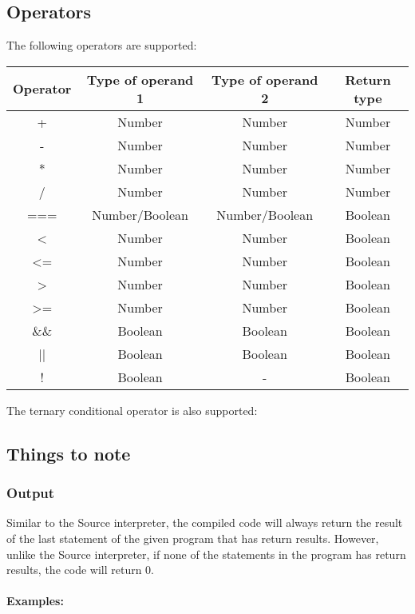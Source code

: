 \subsection{Operators}
The following operators are supported: 
\begin{center}
  \begin{tabular}{|c | c | c | c|} 
   \hline
   Operator & Type of operand 1 & Type of operand 2 & Return type \\ 
   \hline\hline
   + & Number & Number & Number \\ 
   \hline
   - & Number & Number & Number \\ 
   \hline
   * & Number & Number & Number \\ 
   \hline
   / & Number & Number & Number \\ 
   \hline
   === & Number/Boolean & Number/Boolean & Boolean \\ 
   \hline
   < & Number & Number & Boolean \\ 
   \hline
   <= & Number & Number & Boolean \\ 
   \hline
   > & Number & Number & Boolean \\ 
   \hline
   >= & Number & Number & Boolean \\ 
   \hline
   \&\& & Boolean & Boolean & Boolean \\ 
   \hline
   || & Boolean & Boolean & Boolean \\ 
   \hline
   ! & Boolean & - & Boolean \\ 
   \hline
  \end{tabular}
\end{center}

The ternary conditional operator is also supported: \\

\subsection{Things to note}
\subsubsection{Output}
Similar to the Source interpreter, the compiled code will always return the result of the last statement of the given program that has return results. However, unlike the Source interpreter, if none of the statements in the program has return results, the code will return 0. 
\\\\
\textbf{Examples:} \\\\
 \\
\\
 \\
\\

